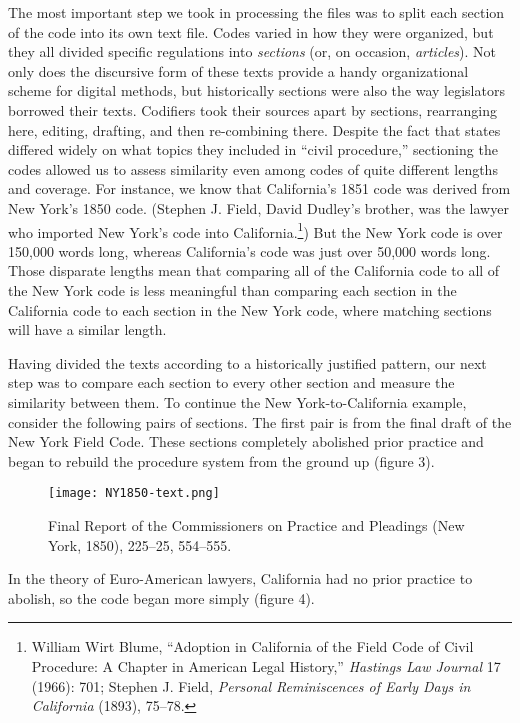 \documentclass[12pt,]{article}
\let\rmarkdownfootnote\footnote%
\def\footnote{\protect\rmarkdownfootnote}
\begin{document}
The most important step we took in processing the files was to split
each section of the code into its own text file. Codes varied in how
they were organized, but they all divided specific regulations into
\emph{sections} (or, on occasion, \emph{articles}). Not only does the
discursive form of these texts provide a handy organizational scheme for
digital methods, but historically sections were also the way legislators
borrowed their texts. Codifiers took their sources apart by sections,
rearranging here, editing, drafting, and then re-combining there.
Despite the fact that states differed widely on what topics they
included in ``civil procedure,'' sectioning the codes allowed us to
assess similarity even among codes of quite different lengths and
coverage. For instance, we know that California's 1851 code was derived
from New York's 1850 code. (Stephen J. Field, David Dudley's brother,
was the lawyer who imported New York's code into California.\footnote{William
  Wirt Blume, ``Adoption in California of the Field Code of Civil
  Procedure: A Chapter in American Legal History,'' \emph{Hastings Law
  Journal} 17 (1966): 701; Stephen J. Field, \emph{Personal
  Reminiscences of Early Days in California} (1893), 75--78.}) But the
New York code is over 150,000 words long, whereas California's code was
just over 50,000 words long. Those disparate lengths mean that comparing
all of the California code to all of the New York code is less
meaningful than comparing each section in the California code to each
section in the New York code, where matching sections will have a
similar length.

Having divided the texts according to a historically justified pattern,
our next step was to compare each section to every other section and
measure the similarity between them. To continue the New
York-to-California example, consider the following pairs of sections.
The first pair is from the final draft of the New York Field Code. These
sections completely abolished prior practice and began to rebuild the
procedure system from the ground up (figure 3).

\begin{figure}
\centering
\texttt{[image: NY1850-text.png]}
\caption{Final Report of the Commissioners on Practice and Pleadings
(New York, 1850), 225--25, 554--555.}
\end{figure}

In the theory of Euro-American lawyers, California had no prior practice
to abolish, so the code began more simply (figure 4).
\end{document}

